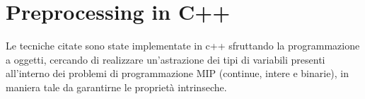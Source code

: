 \documentclass{article}
\begin{document}
\section{Preprocessing in C++}

Le tecniche citate sono state implementate in c++ sfruttando la programmazione a oggetti, cercando di realizzare un'astrazione dei tipi di variabili presenti all'interno dei problemi di programmazione MIP (continue, intere e binarie), in maniera tale da garantirne le proprietà intrinseche.
\end{document}

